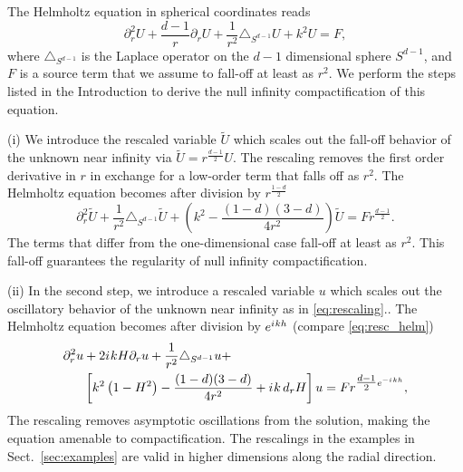 \documentclass[draft,onefignum,onetabnum]{siamart190516}
\newcommand{\iu}{{i\mkern1mu}}
\begin{document}
The Helmholtz equation in spherical coordinates reads
\begin{equation}\label{eq:helm_sph}
	\partial_r^2 U + \frac{d-1}{r} \partial_r U + \frac{1}{r^2}\triangle_{S^{d-1}} U + k^2 U = F,
\end{equation}
where $\triangle_{S^{d-1}}$ is the Laplace operator on the $d-1$ dimensional sphere $S^{d-1}$, and $F$ is a source term that we assume to fall-off at least as $r^2$. We perform the steps listed in the Introduction to derive the null infinity compactification of this equation.

(i) We introduce the rescaled variable $\tilde{U}$ which scales out the fall-off behavior of the unknown near infinity via $\tilde{U} = r^{\tfrac{d-1}{2}} U$. The rescaling removes the first order derivative in $r$ in exchange for a low-order term that falls off as $r^2$. The Helmholtz equation becomes after division by $r^{\tfrac{1-d}{2}}$
\[ \partial_r^2 \tilde{U} + \frac{1}{r^2}\triangle_{S^{d-1}} \tilde{U} + \left(k^2 - \frac{(1-d)(3-d)}{4 r^2} \right) \tilde{U} = F r^{\tfrac{d-1}{2}}. \]
The terms that differ from the one-dimensional case fall-off at least as $r^2$. This fall-off guarantees the regularity of null infinity compactification.

(ii) In the second step, we introduce a rescaled variable $u$ which scales out the oscillatory behavior of the unknown near infinity as in \eqref{eq:rescaling}.. The Helmholtz equation becomes after division by $e^{\iu k h}$ (compare \eqref{eq:resc_helm})
\begin{align*}
	\partial_r^2 u & + 2 \iu k H \partial_r u + \frac{1}{r^2}\triangle_{S^{d-1}} u +                                        \\
	        & \left[k^2 \left(1- H^2\right) - \frac{(1-d)(3-d)}{4 r^2} + \iu k \, d_r H \right] u = F r^{\tfrac{d-1}{2} e^{-\iu k h}},
\end{align*}
The rescaling removes asymptotic oscillations from the solution, making the equation amenable to compactification. The rescalings in the examples in Sect.~\ref{sec:examples} are valid in higher dimensions along the radial direction.
\end{document}
